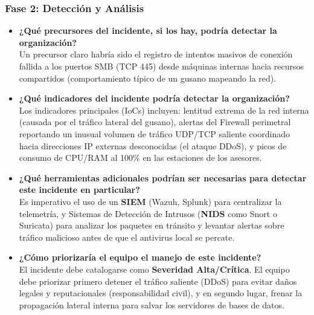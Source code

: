 \documentclass[12pt,a4paper]{article}
\begin{document}
\subsubsection{Fase 2: Detección y Análisis}
\begin{itemize}
    \item \textbf{¿Qué precursores del incidente, si los hay, podría detectar la organización?}\\
    Un precursor claro habría sido el registro de intentos masivos de conexión fallida a los puertos SMB (TCP 445) desde máquinas internas hacia recursos compartidos (comportamiento típico de un gusano mapeando la red).
    \item \textbf{¿Qué indicadores del incidente podría detectar la organización?}\\
    Los indicadores principales (IoCs) incluyen: lentitud extrema de la red interna (causada por el tráfico lateral del gusano), alertas del Firewall perimetral reportando un inusual volumen de tráfico UDP/TCP saliente coordinado hacia direcciones IP externas desconocidas (el ataque DDoS), y picos de consumo de CPU/RAM al 100\% en las estaciones de los asesores.
    \item \textbf{¿Qué herramientas adicionales podrían ser necesarias para detectar este incidente en particular?}\\
    Es imperativo el uso de un \textbf{SIEM} (Wazuh, Splunk) para centralizar la telemetría, y Sistemas de Detección de Intrusos (\textbf{NIDS} como Snort o Suricata) para analizar los paquetes en tránsito y levantar alertas sobre tráfico malicioso antes de que el antivirus local se percate.
    \item \textbf{¿Cómo priorizaría el equipo el manejo de este incidente?}\\
    El incidente debe catalogarse como \textbf{Severidad Alta/Crítica}. El equipo debe priorizar primero detener el tráfico saliente (DDoS) para evitar daños legales y reputacionales (responsabilidad civil), y en segundo lugar, frenar la propagación lateral interna para salvar los servidores de bases de datos.
\end{itemize}
\end{document}
